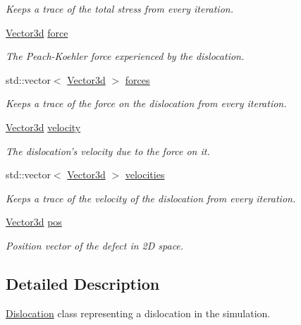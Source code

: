 \begin{DoxyCompactItemize}
\begin{DoxyCompactList}\small\item\em Keeps a trace of the total stress from every iteration. \end{DoxyCompactList}\item 
\hyperlink{classVector3d}{Vector3d} \hyperlink{classDislocation_a9c19c7493d896bd845c489e1ec3cbbb6}{force}
\begin{DoxyCompactList}\small\item\em The Peach-\/\-Koehler force experienced by the dislocation. \end{DoxyCompactList}\item 
std\-::vector$<$ \hyperlink{classVector3d}{Vector3d} $>$ \hyperlink{classDislocation_aa8f4567bbfc6a58aaad01d5c423658c1}{forces}
\begin{DoxyCompactList}\small\item\em Keeps a trace of the force on the dislocation from every iteration. \end{DoxyCompactList}\item 
\hyperlink{classVector3d}{Vector3d} \hyperlink{classDislocation_ad6f4e8e94b2525c2e58a77b9d2916c0e}{velocity}
\begin{DoxyCompactList}\small\item\em The dislocation's velocity due to the force on it. \end{DoxyCompactList}\item 
std\-::vector$<$ \hyperlink{classVector3d}{Vector3d} $>$ \hyperlink{classDislocation_a9ccdef63384a8b965e70f13920a852f8}{velocities}
\begin{DoxyCompactList}\small\item\em Keeps a trace of the velocity of the dislocation from every iteration. \end{DoxyCompactList}\item 
\hyperlink{classVector3d}{Vector3d} \hyperlink{classDefect_aed2731c1beefc22e3db6ad5b18194cdd}{pos}
\begin{DoxyCompactList}\small\item\em Position vector of the defect in 2\-D space. \end{DoxyCompactList}\end{DoxyCompactItemize}


\subsection{Detailed Description}
\hyperlink{classDislocation}{Dislocation} class representing a dislocation in the simulation. 

